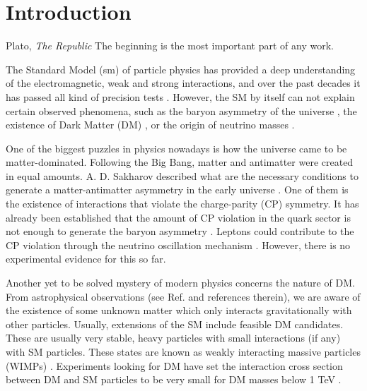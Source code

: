 \chapter{Introduction}
\label{chapter:introduction}


\begin{chapquote}{Plato, \textit{The Republic}}
	The beginning is the most important part of any work.
\end{chapquote}

The Standard Model (\gls{sm}) of particle physics \cite{Glashow1961,Weinberg1967,Salam1968} has provided a deep understanding of the electromagnetic, weak and strong interactions, and over the past decades it has passed all kind of precision tests \cite{Erler2019}. However, the SM by itself can not explain certain observed phenomena, such as the baryon asymmetry of the universe \cite{Canetti2012}, the existence of Dark Matter (DM) \cite{Bertone2004}, or the origin of neutrino masses \cite{King2014}.

One of the biggest puzzles in physics nowadays is how the universe came to be matter-dominated. Following the Big Bang, matter and antimatter were created in equal amounts. A. D. Sakharov described what are the necessary conditions to generate a matter-antimatter asymmetry in the early universe \cite{Sakharov1967}. One of them is the existence of interactions that violate the charge-parity (CP) symmetry. It has already been established that the amount of CP violation in the quark sector is not enough to generate the baryon asymmetry \cite{Gavela1993}. Leptons could contribute to the CP violation through the neutrino oscillation mechanism \cite{Akhmedov1998}. However, there is no experimental evidence for this so far.

Another yet to be solved mystery of modern physics concerns the nature of DM. From astrophysical observations (see Ref. \cite{Bertone2004} and references therein), we are aware of the existence of some unknown matter which only interacts gravitationally with other particles. Usually, extensions of the SM include feasible DM candidates. These are usually very stable, heavy particles with small interactions (if any) with SM particles. These states are known as weakly interacting massive particles (WIMPs) \cite{Lee1977,Jungman1995}. Experiments looking for DM have set the interaction cross section between DM and SM particles to be very small for DM masses below 1 TeV \cite{Arcadi2024}.

